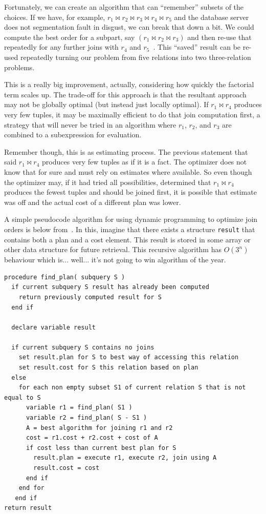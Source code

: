 Fortunately, we can create an algorithm that can ``remember'' subsets of the choices. If we have, for example, $r_{1} \bowtie r_{2} \bowtie r_{3} \bowtie r_{4} \bowtie r_{5}$ and the database server does not segmentation fault in disgust, we can break that down a bit. We could compute the best order for a subpart, say $(r_{1} \bowtie r_{2} \bowtie r_{3})$ and then re-use that repeatedly for any further joins with $r_{4}$ and $r_{5}$~\cite{dsc}. This ``saved'' result can be re-used repeatedly turning our problem from five relations into two three-relation problems.

This is a really big improvement, actually, considering how quickly the factorial term scales up. The trade-off for this approach is that the resultant approach may not be globally optimal (but instead just locally optimal). If $r_{1} \bowtie r_{4}$ produces very few tuples, it may be maximally efficient to do that join computation first, a strategy that will never be tried in an algorithm where $r_{1}$, $r_{2}$, and $r_{3}$ are combined to a subexpression for evaluation. 

Remember though, this is as estimating process. The previous statement that said $r_{1} \bowtie r_{4}$ produces very few tuples as if it is a fact. The optimizer does not know that for sure and must rely on estimates where available. So even though the optimizer may, if it had tried all possibilities, determined that $r_{1} \bowtie r_{4}$ produces the fewest tuples and should be joined first, it is possible that estimate was off and the actual cost of a different plan was lower.

A simple pseudocode algorithm for using dynamic programming to optimize join orders is below from~\cite{dsc}. In this, imagine that there exists a structure \texttt{result} that contains both a plan and a cost element. This result is stored in some array or other data structure for future retrieval. This recursive algorithm has $O(3^{n})$ behaviour which is... well... it's not going to win algorithm of the year.

\begin{verbatim}
procedure find_plan( subquery S ) 
  if current subquery S result has already been computed
    return previously computed result for S
  end if

  declare variable result

  if current subquery S contains no joins
    set result.plan for S to best way of accessing this relation
    set result.cost for S this relation based on plan
  else 
    for each non empty subset S1 of current relation S that is not equal to S
      variable r1 = find_plan( S1 ) 
      variable r2 = find_plan( S - S1 )
      A = best algorithm for joining r1 and r2
      cost = r1.cost + r2.cost + cost of A
      if cost less than current best plan for S
        result.plan = execute r1, execute r2, join using A
        result.cost = cost
      end if  
    end for
   end if
return result
\end{verbatim}


